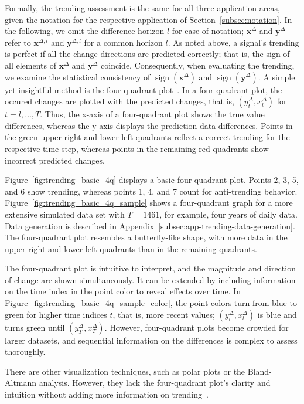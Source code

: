 \documentclass[pdflatex]{sn-jnl}
\theoremstyle{plain}%
\theoremstyle{definition}
\DeclareMathOperator{\sign}{sign}
\newcommand{\diffxl}{\mathbf{x}^{\Delta,l}}
\newcommand{\diffyl}{\mathbf{y}^{\Delta,l}}
\newcommand{\diffx}{\mathbf{x}^{\Delta}}
\newcommand{\diffy}{\mathbf{y}^{\Delta}}
\newcommand{\diffxt}[1][t]{x^{\Delta}_{#1}}
\newcommand{\diffyt}[1][t]{y^{\Delta}_{#1}}
\begin{document}
Formally, the trending assessment is the same for all three application areas, given the notation for the respective application of Section~\ref{subsec:notation}.
In the following, we omit the difference horizon $l$ for ease of notation; $\diffx$ and $\diffy$ refer to $\diffxl$ and $\diffyl$ for a common horizon $l$.
As noted above, a signal's trending is perfect if all the change directions are predicted correctly; that is, the sign of all elements of $\diffx$ and $\diffy$ coincide.
Consequently, when evaluating the trending, we examine the statistical consistency of $\sign(\diffx)$ and $\sign(\diffy)$.
A simple yet insightful method is the four-quadrant plot~\citep[see, e.g., ][]{perrino1998intraoperative,Saugel2015}.
In a four-quadrant plot, the occured changes are plotted with the predicted changes, that is, $(\diffyt, \diffxt)$ for $t = l, \dots, T$.
Thus, the x-axis of a four-quadrant plot shows the true value differences, whereas the y-axis displays the prediction data differences.
Points in the green upper right and lower left quadrants reflect a correct trending for the respective time step, whereas points in the remaining red quadrants show incorrect predicted changes.

Figure~\ref{fig:trending_basic_4q} displays a basic four-quadrant plot.
Points 2, 3, 5, and 6 show trending, whereas points 1, 4, and 7 count for anti-trending behavior.
Figure~\ref{fig:trending_basic_4q_sample} shows a four-quadrant graph for a more extensive simulated data set with $T=1461$, for example, four years of daily data.
Data generation is described in Appendix~\ref{subsec:app-trending-data-generation}.
The four-quadrant plot resembles a butterfly-like shape, with more data in the upper right and lower left quadrants than in the remaining quadrants.

The four-quadrant plot is intuitive to interpret, and the magnitude and direction of change are shown simultaneously.
It can be extended by including information on the time index in the point color to reveal effects over time.
In Figure~\ref{fig:trending_basic_4q_sample_color}, the point colors turn from blue to green for higher time indices $t$, that is, more recent values; $(\diffyt[l], \diffxt[l])$ is blue and turns green until $(\diffyt[T], \diffxt[T])$.
However, four-quadrant plots become crowded for larger datasets, and sequential information on the differences is complex to assess thoroughly.

There are other visualization techniques, such as polar plots or the Bland-Altmann analysis.
However, they lack the four-quadrant plot's clarity and intuition without adding more information on trending~\citep{Saugel2015}.
\end{document}
